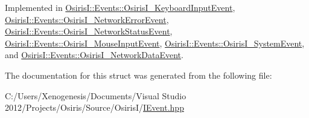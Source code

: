 Implemented in \hyperlink{struct_osiris_i_1_1_events_1_1_osiris_i___keyboard_input_event_a4a56cfbebd50f15dd986f9c21c7c70e2}{Osiris\-I\-::\-Events\-::\-Osiris\-I\-\_\-\-Keyboard\-Input\-Event}, \hyperlink{struct_osiris_i_1_1_events_1_1_osiris_i___network_error_event_a30a68e8242bbc9cdc9ecc49aa2e14191}{Osiris\-I\-::\-Events\-::\-Osiris\-I\-\_\-\-Network\-Error\-Event}, \hyperlink{struct_osiris_i_1_1_events_1_1_osiris_i___network_status_event_aa07fec6e959f0b16ce2e1e4a541b1bc5}{Osiris\-I\-::\-Events\-::\-Osiris\-I\-\_\-\-Network\-Status\-Event}, \hyperlink{struct_osiris_i_1_1_events_1_1_osiris_i___mouse_input_event_a0d214f16be1601ccbb1b7b3b3b9833e9}{Osiris\-I\-::\-Events\-::\-Osiris\-I\-\_\-\-Mouse\-Input\-Event}, \hyperlink{struct_osiris_i_1_1_events_1_1_osiris_i___system_event_a28e210babfa98ce46188916277812322}{Osiris\-I\-::\-Events\-::\-Osiris\-I\-\_\-\-System\-Event}, and \hyperlink{struct_osiris_i_1_1_events_1_1_osiris_i___network_data_event_afa389e169d53036565c40d57892edc19}{Osiris\-I\-::\-Events\-::\-Osiris\-I\-\_\-\-Network\-Data\-Event}.



The documentation for this struct was generated from the following file\-:\begin{DoxyCompactItemize}
\item 
C\-:/\-Users/\-Xenogenesis/\-Documents/\-Visual Studio 2012/\-Projects/\-Osiris/\-Source/\-Osiris\-I/\hyperlink{_i_event_8hpp}{I\-Event.\-hpp}\end{DoxyCompactItemize}
